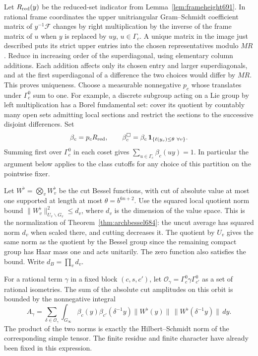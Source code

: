 \documentclass[a4paper,11pt]{article}
\theoremstyle{definition}
\theoremstyle{remark}
\numberwithin{equation}{section}
\begin{document}
Let \(R_{\rm red}(y)\) be the reduced-set indicator from
Lemma~\ref{lem:frameheight691}. In rational frame coordinates
the upper unitriangular Gram--Schmidt coefficient matrix of
\(y^{-1}\mathcal F\) changes by right multiplication by the
inverse of the frame matrix of \(u\) when \(y\) is replaced
by \(uy\), \(u\in\Gamma_c\). A unique matrix in the image
just described puts its strict upper entries into the chosen
representatives modulo \(MR\). Reduce in increasing order
of the superdiagonal, using elementary column additions.
Each addition affects only its chosen entry and larger
superdiagonals, and at the first superdiagonal of a difference
the two choices would differ by \(MR\). This proves uniqueness.
Choose a measurable nonnegative \(p_c\) whose translates
under \(\Gamma_c^0\) sum to one. For example, a discrete
subgroup acting on a Lie group by left multiplication has a
Borel fundamental set: cover its quotient by countably many
open sets admitting local sections and restrict the sections
to the successive disjoint differences. Set
\[
     \beta_c=p_cR_{\rm red},\qquad
     \beta_c^\Box=\beta_c\,{\bf1}_{\{\ell(y_v)\le\theta\ \forall v\}} .
\]
Summing first over \(\Gamma_c^0\) in each coset gives
\(\sum_{u\in\Gamma_c}\beta_c(uy)=1\). In particular the
argument below applies to the class cutoffs for any choice
of this partition on the pointwise fixer.

Let \(W^\flat=\bigotimes_v W_v^\flat\) be the cut Bessel
functions, with cut of absolute value at most one supported
at length at most \(\theta=b^{6n+2}\). Use the squared local
quotient norm bound \(\|W_v^\flat\|_{U_v\backslash G_v}^2\le d_v\),
where \(d_v\) is the dimension of the value space. This is
the normalization of Theorem~\ref{thm:archbessel684}: the
uncut average has squared norm \(d_v\) when scaled there,
and cutting decreases it. The quotient by \(U_v\) gives the
same norm as the quotient by the Bessel group since the
remaining compact group has Haar mass one and acts unitarily.
The zero function also satisfies the bound. Write
\(d_B=\prod_v d_v\).

For a rational term \(\gamma\) in a fixed block \((c,s,c')\),
let \(\mathcal O_\gamma=\Gamma_c^0\gamma\Gamma_{c'}^0\) as a
set of rational isometries. The sum of the absolute cut
amplitudes on this orbit is bounded by the nonnegative integral
\[
 A_\gamma=\sum_{\delta\in\mathcal O_\gamma}\int_{G_\infty}
      \beta_c(y)\beta_{c'}(\delta^{-1}y)
        \|W^\flat(y)\|\,\|W^\flat(\delta^{-1}y)\|\,dy.
\]
The product of the two norms is exactly the Hilbert--Schmidt
norm of the corresponding simple tensor. The finite residue
and finite character have already been fixed in this expression.
\end{document}
